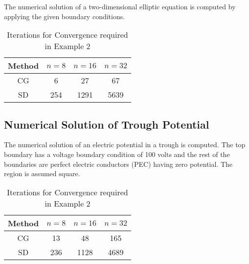 \documentclass[11pt]{article}
\begin{document}
The numerical solution of a two-dimensional elliptic equation is computed by applying the given boundary conditions.


\begin{table}[!hbt]
\begin{center}
{\def\arraystretch{.95}
\begin{tabular}{|c|c|c|c|}
\hline
Method  & $n = 8$  &  $n = 16$  &  $n = 32$\\
\hline
CG & 6 & 27&67\\ 
\hline
SD & 254 & 1291 & 5639\\ 
\hline
\end{tabular}}
\end{center}
\caption{Iterations for Convergence required in Example 2}
\end{table}
%
%
\subsection{Numerical Solution of Trough Potential}

The numerical solution of an electric potential in a trough is computed. The top boundary has a voltage boundary condition of 100 volts and the rest of the boundaries are perfect electric conductors (PEC) having zero potential. The region is assumed square.


\begin{table}[!hbt]
\begin{center}
{\def\arraystretch{.95}
\begin{tabular}{|c|c|c|c|}
\hline
Method  & $n = 8$  &  $n = 16$  &  $n = 32$\\
\hline
CG & 13 & 48&165\\ 
\hline
SD & 236 & 1128 &4689\\ 
\hline
\end{tabular}}
\end{center}
\caption{Iterations for Convergence required in Example 2}
\end{table}
%
%
\end{document}

